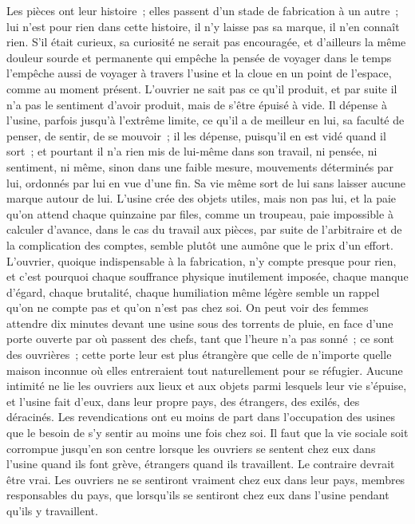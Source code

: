 \documentclass[french,twoside]{book} %
\begin{document}
Les pièces ont leur histoire ; elles passent d'un stade de fabrication à un autre ; lui n'est pour rien dans cette histoire, il n'y laisse pas sa marque, il n'en connaît rien. S'il était curieux, sa curiosité ne serait pas encouragée, et d'ailleurs la même douleur sourde et permanente qui empêche la pensée de voyager dans le temps l'empêche aussi de voyager à travers l'usine et la cloue en un point de l'espace, comme au moment présent. L'ouvrier ne sait pas ce qu'il produit, et par suite il n'a pas le sentiment d'avoir produit, mais de s'être épuisé à vide. Il dépense à l'usine, parfois jusqu'à l'extrême limite, ce qu'il a de meilleur en lui, sa faculté de penser, de sentir, de se mouvoir ; il les dépense, puisqu'il en est vidé quand il sort ; et pourtant il n'a rien mis de lui-même dans son travail, ni pensée, ni sentiment, ni même, sinon dans une faible mesure, mouvements déterminés par lui, ordonnés par lui en vue d'une fin. Sa vie même sort de lui sans laisser aucune marque autour de lui. L'usine crée des objets utiles, mais non pas lui, et la paie qu'on attend chaque quinzaine par files, comme un troupeau, paie impossible à calculer d'avance, dans le cas du travail aux pièces, par suite de l'arbitraire et de la complication des comptes, semble plutôt une aumône que le prix d'un effort. L'ouvrier, quoique indispensable à la fabrication, n'y compte presque pour rien, et c'est pourquoi chaque souffrance physique inutilement imposée, chaque manque d'égard, chaque brutalité, chaque humiliation même légère semble un rappel qu'on ne compte pas et qu'on n'est pas chez soi. On peut voir des femmes attendre dix minutes devant une usine sous des torrents de pluie, en face d'une porte ouverte par où passent des chefs, tant que l'heure n'a pas sonné ; ce sont des ouvrières ; cette porte leur est plus étrangère que celle de n'importe quelle maison inconnue où elles entreraient tout naturellement pour se réfugier. Aucune intimité ne lie les ouvriers aux lieux et aux objets parmi lesquels leur vie s'épuise, et l'usine fait d'eux, dans leur propre pays, des étrangers, des exilés, des déracinés. Les revendications ont eu moins de part dans l'occupation des usines que le besoin de s'y sentir au moins une fois chez soi. Il faut que la vie sociale soit corrompue jusqu'en son centre lorsque les ouvriers se sentent chez eux dans l'usine quand ils font grève, étrangers quand ils travaillent. Le contraire devrait être vrai. Les ouvriers ne se sentiront vraiment chez eux dans leur pays, membres responsables du pays, que lorsqu'ils se sentiront chez eux dans l'usine pendant qu'ils y travaillent.\par
\end{document}

